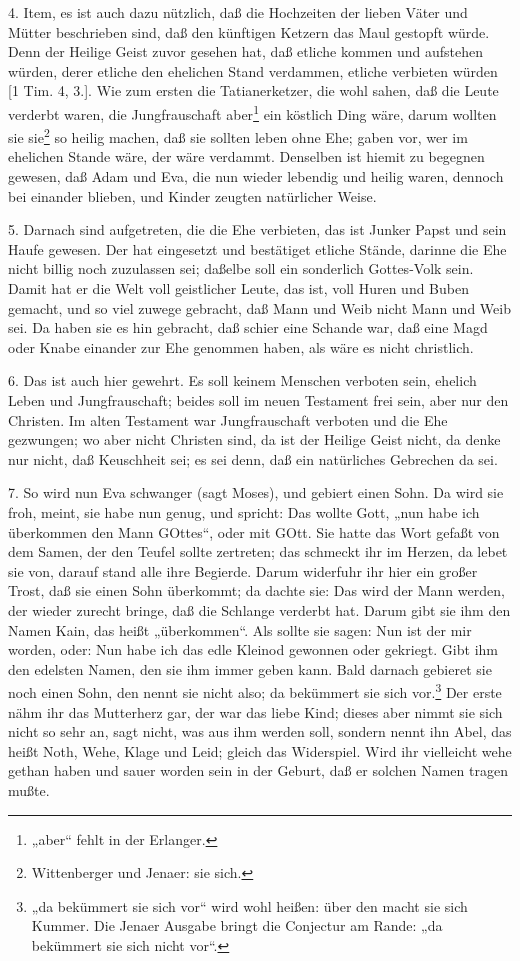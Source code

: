4. Item, es ist auch dazu nützlich, daß die Hochzeiten der lieben Väter und Mütter beschrieben sind, daß den künftigen Ketzern das Maul gestopft würde. Denn der Heilige Geist zuvor gesehen hat, daß etliche kommen und aufstehen würden, derer etliche den ehelichen Stand verdammen, etliche verbieten würden [1 Tim. 4, 3.]. Wie zum ersten die Tatianerketzer, die wohl sahen, daß die Leute verderbt waren, die Jungfrauschaft aber\footnote{„aber“ fehlt in der Erlanger.} ein köstlich Ding wäre, darum wollten sie sie\footnote{Wittenberger und Jenaer: sie sich.} so heilig machen, daß sie sollten leben ohne Ehe; gaben vor, wer im ehelichen Stande wäre, der wäre verdammt. Denselben ist hiemit zu begegnen gewesen, daß Adam und Eva, die nun wieder lebendig und heilig waren, dennoch bei einander blieben, und Kinder zeugten natürlicher Weise.

5. Darnach sind aufgetreten, die die Ehe verbieten, das ist Junker Papst und sein Haufe gewesen. Der hat eingesetzt und bestätiget etliche Stände, darinne die Ehe nicht billig noch zuzulassen sei; daßelbe soll ein sonderlich Gottes-Volk sein. Damit hat er die Welt voll geistlicher Leute, das ist, voll Huren und Buben gemacht, und so viel zuwege gebracht, daß Mann und Weib nicht Mann und Weib sei. Da haben sie es hin gebracht, daß schier eine Schande war, daß eine Magd oder Knabe einander zur Ehe genommen haben, als wäre es nicht christlich.

6. Das ist auch hier gewehrt. Es soll keinem Menschen verboten sein, ehelich Leben und Jungfrauschaft; beides soll im neuen Testament frei sein, aber nur den Christen. Im alten Testament war Jungfrauschaft verboten und die Ehe gezwungen; wo aber nicht Christen sind, da ist der Heilige Geist nicht, da denke nur nicht, daß Keuschheit sei; es sei denn, daß ein natürliches Gebrechen da sei.

7. So wird nun Eva schwanger (sagt Moses), und gebiert einen Sohn. Da wird sie froh, meint, sie habe nun genug, und spricht: Das wollte Gott, „nun habe ich überkommen den Mann GOttes“, oder mit GOtt. Sie hatte das Wort gefaßt von dem Samen, der den Teufel
sollte zertreten; das schmeckt ihr im Herzen, da lebet sie von, darauf stand alle ihre Begierde. Darum widerfuhr ihr hier ein großer Trost, daß sie einen Sohn überkommt; da dachte sie: Das wird der Mann werden, der wieder zurecht bringe, daß die Schlange verderbt hat. Darum gibt sie ihm den Namen Kain, das heißt „überkommen“. Als sollte sie sagen: Nun ist der mir worden, oder: Nun habe ich das edle Kleinod gewonnen oder gekriegt. Gibt ihm den edelsten Namen, den sie ihm immer geben kann. Bald darnach gebieret sie noch einen Sohn, den nennt sie nicht also; da bekümmert sie sich vor.\footnote{„da bekümmert sie sich vor“ wird wohl heißen: über den macht sie sich Kummer. Die Jenaer Ausgabe bringt die Conjectur am Rande: „da bekümmert sie sich nicht vor“.} Der erste nähm ihr das Mutterherz gar, der war das liebe Kind; dieses aber nimmt sie sich nicht so sehr an, sagt nicht, was aus ihm werden soll, sondern nennt ihn Abel, das heißt Noth, Wehe, Klage und Leid; gleich das Widerspiel. Wird ihr vielleicht wehe gethan haben und sauer worden sein in der Geburt, daß er solchen Namen tragen mußte.

